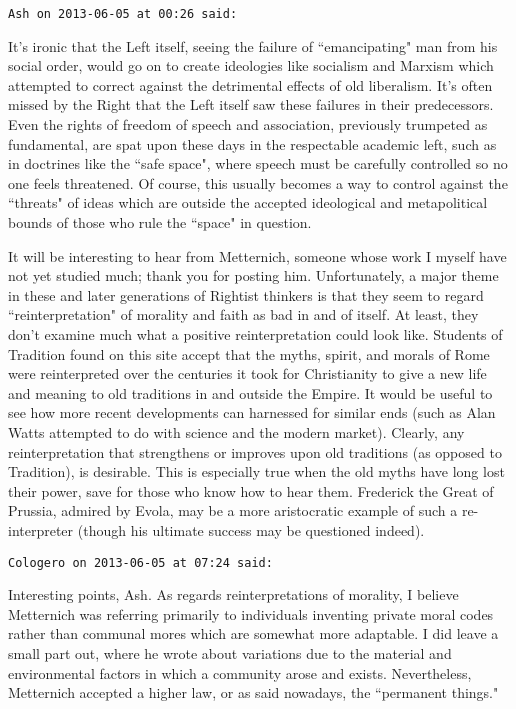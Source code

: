 \begin{footnotesize}\begin{sffamily}



\texttt{Ash on 2013-06-05 at 00:26 said: }

It's ironic that the Left itself, seeing the failure of ``emancipating" man from his social order, would go on to create ideologies like socialism and Marxism which attempted to correct against the detrimental effects of old liberalism. It's often missed by the Right that the Left itself saw these failures in their predecessors. Even the rights of freedom of speech and association, previously trumpeted as fundamental, are spat upon these days in the respectable academic left, such as in doctrines like the ``safe space", where speech must be carefully controlled so no one feels threatened. Of course, this usually becomes a way to control against the ``threats" of ideas which are outside the accepted ideological and metapolitical bounds of those who rule the ``space" in question. 

It will be interesting to hear from Metternich, someone whose work I myself have not yet studied much; thank you for posting him. Unfortunately, a major theme in these and later generations of Rightist thinkers is that they seem to regard ``reinterpretation" of morality and faith as bad in and of itself. At least, they don't examine much what a positive reinterpretation could look like. Students of Tradition found on this site accept that the myths, spirit, and morals of Rome were reinterpreted over the centuries it took for Christianity to give a new life and meaning to old traditions in and outside the Empire. It would be useful to see how more recent developments can harnessed for similar ends (such as Alan Watts attempted to do with science and the modern market). Clearly, any reinterpretation that strengthens or improves upon old traditions (as opposed to Tradition), is desirable. This is especially true when the old myths have long lost their power, save for those who know how to hear them. Frederick the Great of Prussia, admired by Evola, may be a more aristocratic example of such a re-interpreter (though his ultimate success may be questioned indeed).


\hfill

\texttt{Cologero on 2013-06-05 at 07:24 said: }

Interesting points, Ash. As regards reinterpretations of morality, I believe Metternich was referring primarily to individuals inventing private moral codes rather than communal mores which are somewhat more adaptable. I did leave a small part out, where he wrote about variations due to the material and environmental factors in which a community arose and exists. Nevertheless, Metternich accepted a higher law, or as said nowadays, the ``permanent things."


\end{sffamily}
\end{footnotesize}
